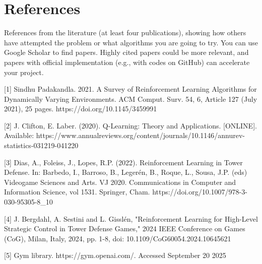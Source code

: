 \documentclass[12pt]{article}
\begin{document}
\section*{References}
References from the literature (at least four publications), showing how others have attempted the problem or what algorithms you are going to try. You can use Google Scholar to find papers. Highly cited papers could be more relevant, and papers with official implementation (e.g., with codes on GitHub) can accelerate your project. \par

[1] Sindhu Padakandla. 2021. A Survey of Reinforcement Learning Algorithms for Dynamically Varying Environments. ACM Comput. Surv. 54, 6, Article 127 (July 2021), 25 pages.
https://doi.org/10.1145/3459991 \par

[2] J. Clifton, E. Laber. (2020). Q-Learning: Theory and Applications. [ONLINE]. Available: https://www.annualreviews.org/content/journals/10.1146/annurev-statistics-031219-041220 \par

[3] Dias, A., Foleiss, J., Lopes, R.P. (2022). Reinforcement Learning in Tower Defense. In: Barbedo, I., Barroso, B., Legerén, B., Roque, L., Sousa, J.P. (eds) Videogame Sciences and Arts. VJ 2020. Communications in Computer and Information Science, vol 1531. Springer, Cham. https://doi.org/10.1007/978-3-030-95305-8\_10 \par 

[4] J. Bergdahl, A. Sestini and L. Gisslén, "Reinforcement Learning for High-Level Strategic Control in Tower Defense Games," 2024 IEEE Conference on Games (CoG), Milan, Italy, 2024, pp. 1-8, doi: 10.1109/CoG60054.2024.10645621 \par

[5] Gym library. https://gym.openai.com/. Accessed September 20 2025
\end{document}
